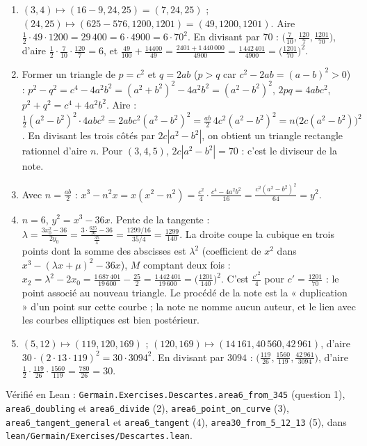 \documentclass[11pt,a4paper]{article}
\begin{document}
\begin{solution}
\begin{enumerate}
\item $(3,4) \mapsto (16 - 9, 24, 25) = (7, 24, 25)$ ; $(24, 25) \mapsto
  (625 - 576, 1200, 1201) = (49, 1200, 1201)$. Aire $\frac12\cdot49\cdot1200 =
  29\,400 = 6\cdot 4900 = 6\cdot 70^2$. En divisant par $70$ :
  $\bigl(\frac{7}{10}, \frac{120}{7}, \frac{1201}{70}\bigr)$, d'aire
  $\frac12\cdot\frac{7}{10}\cdot\frac{120}{7} = 6$, et
  $\frac{49}{100} + \frac{14400}{49} = \frac{2401 + 1\,440\,000}{4900} =
  \frac{1\,442\,401}{4900} = \bigl(\frac{1201}{70}\bigr)^2$.
\item Former un triangle de $p = c^2$ et $q = 2ab$ ($p > q$ car
  $c^2 - 2ab = (a-b)^2 > 0$) : $p^2 - q^2 = c^4 - 4a^2b^2 = (a^2+b^2)^2 - 4a^2b^2 =
  (a^2 - b^2)^2$, $2pq = 4abc^2$, $p^2 + q^2 = c^4 + 4a^2b^2$. Aire :
  $\frac12(a^2-b^2)^2\cdot 4abc^2 = 2abc^2(a^2-b^2)^2 = \frac{ab}{2}\,4c^2(a^2 -
  b^2)^2 = n\bigl(2c(a^2-b^2)\bigr)^2$. En divisant les trois côtés par
  $2c|a^2 - b^2|$, on obtient un triangle rectangle rationnel d'aire $n$. Pour
  $(3,4,5)$, $2c|a^2-b^2| = 70$ : c'est le diviseur de la note.
\item Avec $n = \frac{ab}{2}$ : $x^3 - n^2x = x(x^2 - n^2) = \frac{c^2}{4}\cdot
  \frac{c^4 - 4a^2b^2}{16} = \frac{c^2(a^2-b^2)^2}{64} = y^2$.
\item $n = 6$, $y^2 = x^3 - 36x$. Pente de la tangente :
  $\lambda = \frac{3x_0^2 - 36}{2y_0} = \frac{3\cdot\frac{625}{16} - 36}{\frac{35}{4}}
  = \frac{1299/16}{35/4} = \frac{1299}{140}$. La droite coupe la cubique en trois
  points dont la somme des abscisses est $\lambda^2$ (coefficient de $x^2$ dans
  $x^3 - (\lambda x + \mu)^2 - 36x$), $M$ comptant deux fois :
  $x_2 = \lambda^2 - 2x_0 = \frac{1\,687\,401}{19\,600} - \frac{25}{2} =
  \frac{1\,442\,401}{19\,600} = \bigl(\frac{1201}{140}\bigr)^2$. C'est
  $\frac{c'^2}{4}$ pour $c' = \frac{1201}{70}$ : le point associé au nouveau
  triangle. Le procédé de la note est la « duplication » d'un point sur cette
  courbe ; la note ne nomme aucun auteur, et le lien avec les courbes elliptiques
  est bien postérieur.
\item $(5,12) \mapsto (119, 120, 169)$ ; $(120, 169) \mapsto (14\,161, 40\,560,
  42\,961)$, d'aire $30\cdot(2\cdot13\cdot119)^2 = 30\cdot 3094^2$. En divisant
  par $3094$ : $\bigl(\frac{119}{26}, \frac{1560}{119}, \frac{42\,961}{3094}\bigr)$,
  d'aire $\frac12\cdot\frac{119}{26}\cdot\frac{1560}{119} = \frac{780}{26} = 30$.
\end{enumerate}

Vérifié en Lean : \texttt{Germain.Exercises.Descartes.area6\_from\_345} (question 1),
\texttt{area6\_doubling} et \texttt{area6\_divide} (2), \texttt{area6\_point\_on\_curve} (3),
\texttt{area6\_tangent\_general} et \texttt{area6\_tangent} (4), \texttt{area30\_from\_5\_12\_13}
(5), dans \texttt{lean/Germain/Exercises/Descartes.lean}.

\end{solution}
\end{document}
